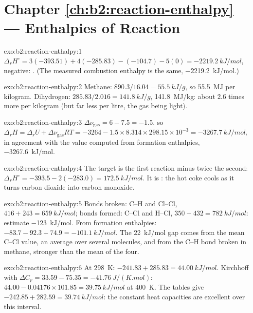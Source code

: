 \section*{Chapter \ref{ch:b2:reaction-enthalpy} --- Enthalpies of Reaction}

\begin{solution}{exo:b2:reaction-enthalpy:1}
$\Delta_r H^\circ = 3(-393.51) + 4(-285.83) - (-104.7) - 5(0) =
\qty{-2219.2}{kJ/mol}$, negative: . (The measured combustion
enthalpy is the same, \qty{-2219.2}{kJ/mol}.)
\end{solution}

\begin{solution}{exo:b2:reaction-enthalpy:2}
Methane: $890.3/16.04 = \qty{55.5}{kJ/g}$, so \qty{55.5}{MJ} per
kilogram. Dihydrogen: $285.83/2.016 = \qty{141.8}{kJ/g}$,
\qty{141.8}{MJ/kg}: about 2.6 times more per kilogram (but far less per
litre, the gas being light).
\end{solution}

\begin{solution}{exo:b2:reaction-enthalpy:3}
$\Delta\nu_{\text{gas}} = 6 - 7.5 = -1.5$, so $\Delta_r H = \Delta_r U +
\Delta\nu_{\text{gas}}RT = -3264 - 1.5 \times 8.314 \times 298.15 \times
10^{-3} = \qty{-3267.7}{kJ/mol}$, in agreement with the value computed from
formation enthalpies, \qty{-3267.6}{kJ/mol}.
\end{solution}

\begin{solution}{exo:b2:reaction-enthalpy:4}
The target is the first reaction minus twice the second:
$\Delta_r H^\circ = -393.5 - 2(-283.0) = \qty{+172.5}{kJ/mol}$. It is
: the hot coke cools as it turns carbon dioxide into carbon
monoxide.
\end{solution}

\begin{solution}{exo:b2:reaction-enthalpy:5}
Bonds broken: C--H and Cl--Cl, $416 + 243 = \qty{659}{kJ/mol}$; bonds
formed: C--Cl and H--Cl, $350 + 432 = \qty{782}{kJ/mol}$: estimate
\qty{-123}{kJ/mol}. From formation enthalpies: $-83.7 - 92.3 + 74.9 =
\qty{-101.1}{kJ/mol}$. The \qty{22}{kJ/mol} gap comes from the mean C--Cl
value, an average over several molecules, and from the C--H bond broken in
methane, stronger than the mean of the four.
\end{solution}

\begin{solution}{exo:b2:reaction-enthalpy:6}
At \qty{298}{K}: $-241.83 + 285.83 = \qty{44.00}{kJ/mol}$. Kirchhoff with
$\Delta C_p = 33.59 - 75.35 = \qty{-41.76}{J/(K.mol)}$:
$44.00 - 0.04176 \times 101.85 = \qty{39.75}{kJ/mol}$ at \qty{400}{K}. The
tables give $-242.85 + 282.59 = \qty{39.74}{kJ/mol}$: the constant heat
capacities are excellent over this interval.
\end{solution}

